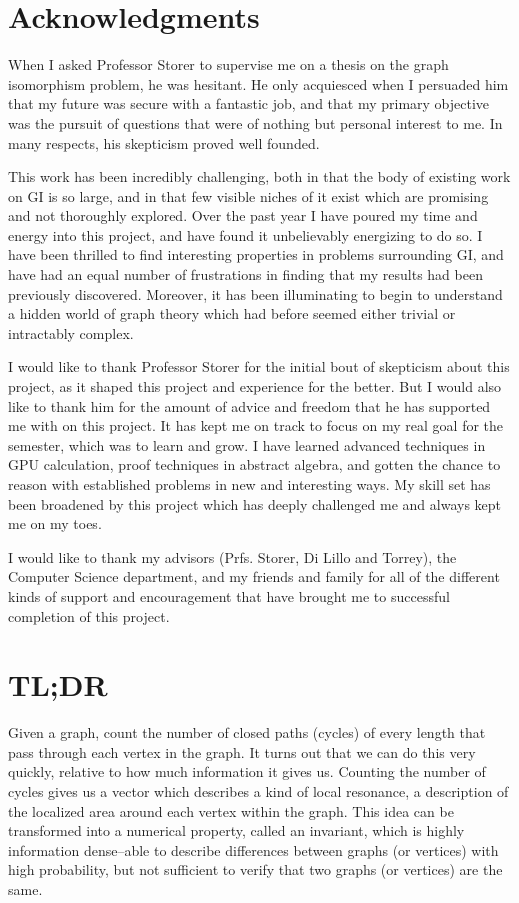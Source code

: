 \chapter*{Acknowledgments}

When I asked Professor Storer to supervise me on a thesis on the graph isomorphism problem, he was hesitant.
He only acquiesced when I persuaded him that my future was secure with a fantastic job, and that my primary objective was the pursuit of questions that were of nothing but personal interest to me.
In many respects, his skepticism proved well founded.

This work has been incredibly challenging, both in that the body of existing work on GI is so large, and in that few visible niches of it exist which are promising and not thoroughly explored.
Over the past year I have poured my time and energy into this project, and have found it unbelievably energizing to do so.
I have been thrilled to find interesting properties in problems surrounding GI, and have had an equal number of frustrations in finding that my results had been previously discovered.
Moreover, it has been illuminating to begin to understand a hidden world of graph theory which had before seemed either trivial or intractably complex.

I would like to thank Professor Storer for the initial bout of skepticism about this project, as it shaped this project and experience for the better.
But I would also like to thank him for the amount of advice and freedom that he has supported me with on this project.
It has kept me on track to focus on my real goal for the semester, which was to learn and grow.
I have learned advanced techniques in GPU calculation, proof techniques in abstract algebra, and gotten the chance to reason with established problems in new and interesting ways.
My skill set has been broadened by this project which has deeply challenged me and always kept me on my toes.

I would like to thank my advisors (Prfs. Storer, Di Lillo and Torrey), the Computer Science department, and my friends and family for all of the different kinds of support and encouragement that have brought me to successful completion of this project.

\chapter*{TL;DR}

Given a graph, count the number of closed paths (cycles) of every length that pass through each vertex in the graph.
It turns out that we can do this very quickly, relative to how much information it gives us.
Counting the number of cycles gives us a vector which describes a kind of local resonance, a description of the localized area around each vertex within the graph.
This idea can be transformed into a numerical property, called an invariant, which is highly information dense--able to describe differences between graphs (or vertices) with high probability, but not sufficient to verify that two graphs (or vertices) are the same.

